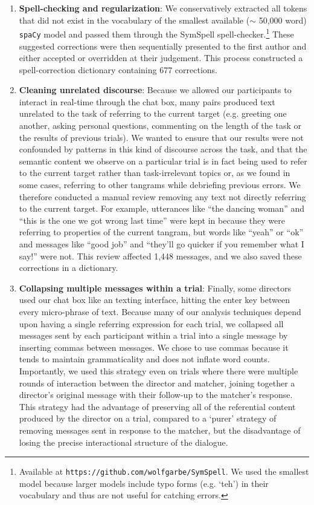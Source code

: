 \documentclass[alpha-refs]{wiley-article}
\begin{document}
\begin{enumerate}

\item \textbf{Spell-checking and regularization}: We conservatively extracted all tokens that did not exist in the vocabulary of the smallest available ($\sim$ 50,000 word) \texttt{spaCy} model and passed them through the SymSpell spell-checker.\footnote{Available at \texttt{https://github.com/wolfgarbe/SymSpell}. We used the smallest model because larger models include typo forms (e.g. `teh') in their vocabulary and thus are not useful for catching errors.} These suggested corrections were then sequentially presented to the first author and either accepted or overridden at their judgement. This process constructed a spell-correction dictionary containing 677 corrections.

\item \textbf{Cleaning unrelated discourse}: Because we allowed our participants to interact in real-time through the chat box, many pairs produced text unrelated to the task of referring to the current target (e.g. greeting one another, asking personal questions, commenting on the length of the task or the results of previous trials). We wanted to ensure that our results were not confounded by patterns in this kind of discourse across the task, and that the semantic content we observe on a particular trial is in fact being used to refer to the current target rather than task-irrelevant topics or, as we found in some cases, referring to other tangrams while debriefing previous errors. We therefore conducted a manual review removing any text not directly referring to the current target. For example, utterances like ``the dancing woman'' and ``this is the one we got wrong last time'' were kept in because they were referring to properties of the current tangram, but words like ``yeah'' or ``ok'' and messages like ``good job'' and ``they'll go quicker if you remember what I say!'' were not. This review affected 1,448 messages, and we also saved these corrections in a dictionary.

\item \textbf{Collapsing multiple messages within a trial}: Finally, some directors used our chat box like an texting interface, hitting the enter key between every micro-phrase of text. Because many of our analysis techniques depend upon having a single referring expression for each trial, we collapsed all messages sent by each participant within a trial into a single message by inserting commas between messages. We chose to use commas because it tends to maintain grammaticality and does not inflate word counts. Importantly, we used this strategy even on trials where there were multiple rounds of interaction between the director and matcher, joining together a director's original message with their follow-up to the matcher's response. This strategy had the advantage of preserving all of the referential content produced by the director on a trial, compared to a `purer' strategy of removing messages sent in response to the matcher, but the disadvantage of losing the precise interactional structure of the dialogue. 

\end{enumerate}
\end{document}
